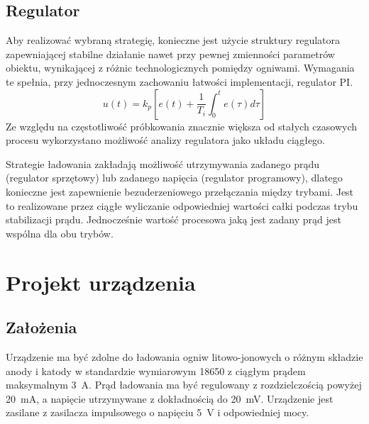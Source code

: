 \documentclass[polish,engineer]{polsl-msth}
\begin{document}
\section{Regulator}
Aby realizować wybraną strategię, konieczne jest użycie struktury regulatora zapewniającej stabilne działanie nawet przy pewnej zmienności parametrów obiektu, wynikającej z różnic technologicznych pomiędzy ogniwami. Wymagania te spełnia, przy jednoczesnym zachowaniu łatwości implementacji, regulator PI.
\begin{equation}
     u(t)=k_{p}\left[e(t)+{\frac {1}{T_{i}}}\int _{0}^{t}e(\tau )d\tau \right]
     \label{eq:PI_timebased}
\end{equation}
Ze względu na częstotliwość próbkowania znacznie większa od stałych czasowych procesu wykorzystano możliwość analizy regulatora jako układu ciągłego.

Strategie ładowania zakładają możliwość utrzymywania zadanego prądu (regulator sprzętowy) lub zadanego napięcia (regulator programowy), dlatego konieczne jest zapewnienie bezuderzeniowego przełączania między trybami. Jest to realizowane przez ciągłe wyliczanie odpowiedniej wartości całki podczas trybu stabilizacji prądu. Jednocześnie wartość procesowa jaką jest zadany prąd jest wspólna dla obu trybów.


\chapter{Projekt urządzenia}
\section{Założenia}
Urządzenie ma być zdolne do ładowania ogniw litowo-jonowych o różnym składzie anody i katody w standardzie wymiarowym 18650 z ciągłym prądem maksymalnym 3~A. Prąd ładowania ma być regulowany z rozdzielczością powyżej 20~mA, a napięcie utrzymywane z dokładnością do 20~mV. Urządzenie jest zasilane z zasilacza impulsowego o napięciu 5~V i odpowiedniej mocy.
\end{document}
